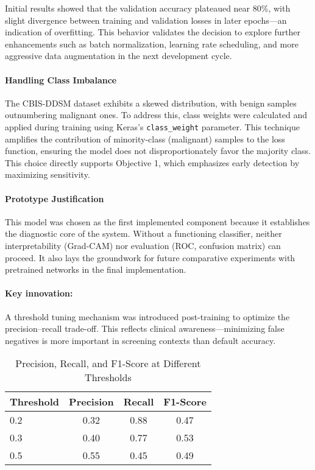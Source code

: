 \documentclass[12pt]{article}
\begin{document}
Initial results showed that the validation accuracy plateaued near 80\%, with slight divergence between training and validation losses in later epochs—an indication of overfitting. This behavior validates the decision to explore further enhancements such as batch normalization, learning rate scheduling, and more aggressive data augmentation in the next development cycle.

\paragraph{Handling Class Imbalance} The CBIS-DDSM dataset exhibits a skewed distribution, with benign samples outnumbering malignant ones. To address this, class weights were calculated and applied during training using Keras’s \texttt{class\_weight} parameter. This technique amplifies the contribution of minority-class (malignant) samples to the loss function, ensuring the model does not disproportionately favor the majority class. This choice directly supports Objective 1, which emphasizes early detection by maximizing sensitivity.

\paragraph{Prototype Justification} This model was chosen as the first implemented component because it establishes the diagnostic core of the system. Without a functioning classifier, neither interpretability (Grad-CAM) nor evaluation (ROC, confusion matrix) can proceed. It also lays the groundwork for future comparative experiments with pretrained networks in the final implementation.

\paragraph{Key innovation:} A threshold tuning mechanism was introduced post-training to optimize the precision–recall trade-off. This reflects clinical awareness—minimizing false negatives is more important in screening contexts than default accuracy.

\begin{table}[H]
\centering
\caption{Precision, Recall, and F1-Score at Different Thresholds}
\begin{tabular}{lccc}
\toprule
Threshold & Precision & Recall & F1-Score \\
\midrule
0.2 & 0.32 & 0.88 & 0.47 \\
0.3 & 0.40 & 0.77 & 0.53 \\
0.5 & 0.55 & 0.45 & 0.49 \\
\bottomrule
\end{tabular}
\end{table}
\end{document}
